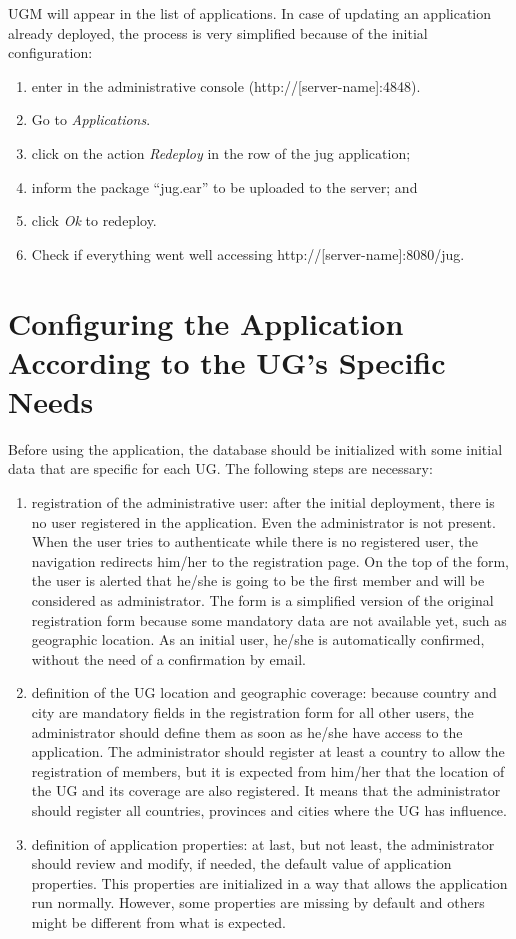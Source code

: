 \documentclass[envcountsame,envcountchap]{svmono}
\begin{document}
UGM will appear in the list of applications. In case of updating an application already deployed, the process is very simplified because of the initial configuration:

\begin{enumerate}
\item enter in the administrative console (http://[server-name]:4848).
\item Go to \textit{Applications}.
\item click on the action \textit{Redeploy} in the row of the jug application;
\item inform the package “jug.ear” to be uploaded to the server; and
\item click \textit{Ok} to redeploy.
\item Check if everything went well accessing http://[server-name]:8080/jug.
\end{enumerate}

\section{Configuring the Application According to the UG's Specific Needs}

Before using the application, the database should be initialized with some initial data that are specific for each UG. The following steps are necessary:

\begin{enumerate}
\item registration of the administrative user: after the initial deployment, there is no user registered in the application. Even the administrator is not present. When the user tries to authenticate while there is no registered user, the navigation redirects him/her to the registration page. On the top of the form, the user is alerted that he/she is going to be the first member and will be considered as administrator. The form is a simplified version of the original registration form because some mandatory data are not available yet, such as geographic location. As an initial user, he/she is automatically confirmed, without the need of a confirmation by email.
\item definition of the UG location and geographic coverage: because country and city are mandatory fields in the registration form for all other users, the administrator should define them as soon as he/she have access to the application. The administrator should register at least a country to allow the registration of members, but it is expected from him/her that the location of the UG and its coverage are also registered. It means that the administrator should register all countries, provinces and cities where the UG has influence.
\item definition of application properties: at last, but not least, the administrator should review and modify, if needed, the default value of application properties. This properties are initialized in a way that allows the application run normally. However, some properties are missing by default and others might be different from what is expected.
\end{enumerate}
\end{document}
